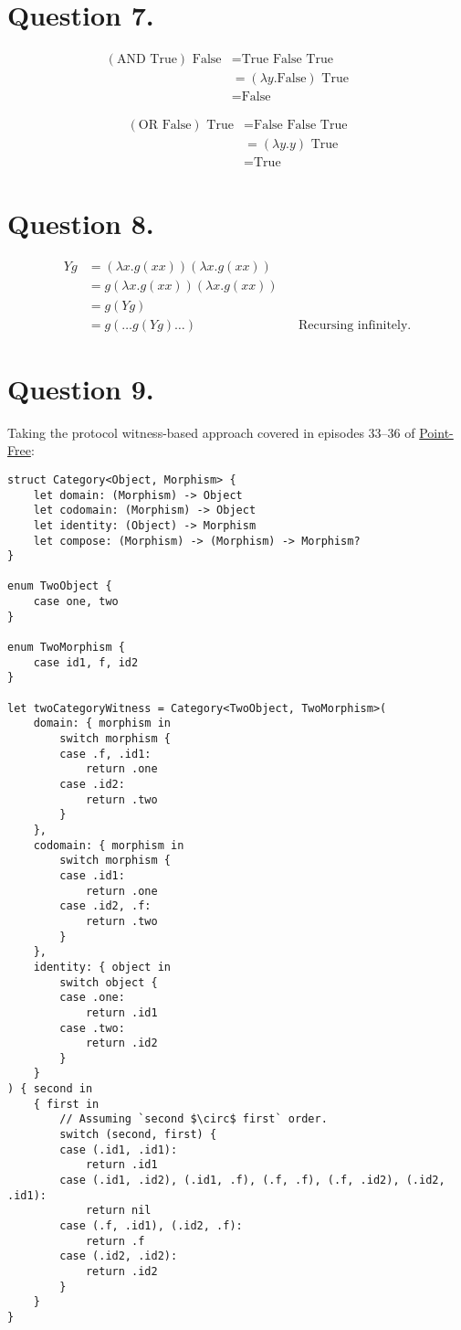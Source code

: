 \documentclass{article}
\begin{document}
\section*{Question 7.}

\begin{align*}
    (\textrm{AND True}) \textrm{ False} &= \textrm{True False True} && \\
    &= (\lambda y.\textrm{False}) \textrm{ True} && \\
    &= \textrm{False}
\end{align*}

\begin{align*}
    (\textrm{OR False}) \textrm{ True} &= \textrm{False False True} \\
    &= (\lambda y.y) \textrm{ True} \\
    &= \textrm{True}
\end{align*}

\section*{Question 8.}

\begin{align*}
    Y g &= (\lambda x.g(xx))(\lambda x.g(xx)) \\
    &= g(\lambda x.g(xx))(\lambda x.g(xx)) \\
    &= g(Y g) \\
    &= g(\ldots g(Yg)\ldots) && \text{Recursing infinitely.}
\end{align*}

\section*{Question 9.}

Taking the protocol witness-based approach covered in episodes 33–36 of \href{https://www.pointfree.co/episodes/ep33-protocol-witnesses-part-1}{Point-Free}:

\begin{verbatim}
struct Category<Object, Morphism> {
	let domain: (Morphism) -> Object
	let codomain: (Morphism) -> Object
	let identity: (Object) -> Morphism
	let compose: (Morphism) -> (Morphism) -> Morphism?
}

enum TwoObject {
	case one, two
}

enum TwoMorphism {
	case id1, f, id2
}

let twoCategoryWitness = Category<TwoObject, TwoMorphism>(
	domain: { morphism in
		switch morphism {
		case .f, .id1:
			return .one
		case .id2:
			return .two
		}
	},
	codomain: { morphism in
		switch morphism {
		case .id1:
			return .one
		case .id2, .f:
			return .two
		}
	},
	identity: { object in
		switch object {
		case .one:
			return .id1
		case .two:
			return .id2
		}
	}
) { second in
	{ first in
		// Assuming `second $\circ$ first` order.
		switch (second, first) {
		case (.id1, .id1):
			return .id1
		case (.id1, .id2), (.id1, .f), (.f, .f), (.f, .id2), (.id2, .id1):
			return nil
		case (.f, .id1), (.id2, .f):
			return .f
		case (.id2, .id2):
			return .id2
		}
	}
}

\end{verbatim}
\end{document}
